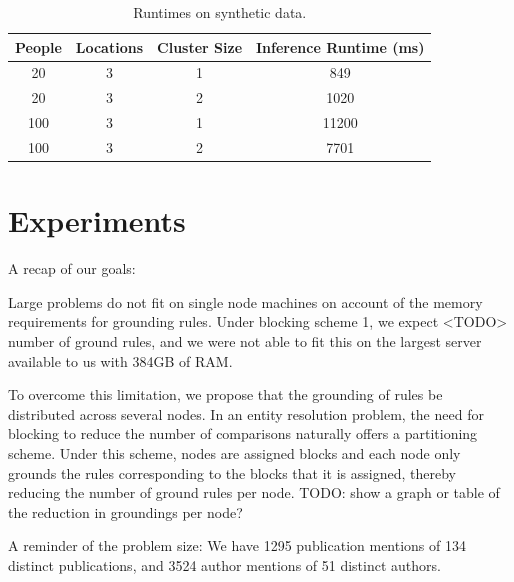 \documentclass{article}
\begin{document}
\begin{table}
   \begin{center}
      \begin{tabular}{| c | c | c | c |}
         \hline
            People & Locations & Cluster Size & Inference Runtime (ms) \\
         \hline
            20 & 3 & 1 & 849 \\
            20 & 3 & 2 & 1020 \\
            100 & 3 & 1 & 11200 \\
            100 & 3 & 2 & 7701 \\
         \hline
      \end{tabular}
      \caption{Runtimes on synthetic data.}
      \label{tab:synthetic-runtimes}
   \end{center}
\end{table}


\section{Experiments}

A recap of our goals:

Large problems do not fit on single node machines on account of the memory requirements for grounding rules. Under blocking scheme 1, we expect <TODO> number of ground rules, and we were not able to fit this on the largest server available to us with 384GB of RAM.

To overcome this limitation, we propose that the grounding of rules be distributed across several nodes. In an entity resolution problem, the need for blocking to reduce the number of comparisons naturally offers a partitioning scheme. Under this scheme, nodes are assigned blocks and each node only grounds the rules corresponding to the blocks that it is assigned, thereby reducing the number of ground rules per node. TODO: show a graph or table of the reduction in groundings per node?

A reminder of the problem size: We have 1295 publication mentions of 134 distinct publications, and 3524 author mentions of 51 distinct authors.
\end{document}
